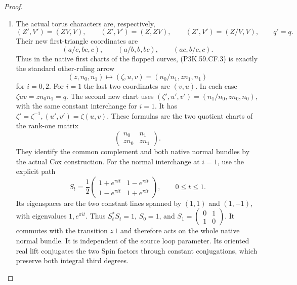 \begin{proof}
\begin{enumerate}[label=\arabic*.]
\item The actual torus characters are, respectively,
\[
 (Z',V')=(ZV,V),\qquad (Z',V')=(Z,ZV),\qquad
 (Z',V')=(Z/V,V),\qquad q'=q.                         \tag{P3K.59.CF.3}
\]
Their new first-triangle coordinates are
\[
 (a/c,bc,c),\qquad (a/b,b,bc),\qquad (ac,b/c,c).        \tag{P3K.59.CF.4}
\]
Thus in the native first charts of the flopped curves, (P3K.59.CF.3)
is exactly the standard other-ruling arrow
\[
 (z,n_0,n_1)\longmapsto
  (\zeta,u,v)=(n_0/n_1,zn_1,n_1)                     \tag{P3K.59.CF.5}
\]
for \(i=0,2\). For \(i=1\) the last two coordinates are
\((v,u)\). In each case \(\zeta uv=zn_0n_1=q\).
The second new chart uses
\((\zeta',u',v')=(n_1/n_0,zn_0,n_0)\), with the same
constant interchange for \(i=1\). It has
\(\zeta'=\zeta^{-1},(u',v')=\zeta(u,v)\).
These formulas are the two quotient charts of the rank-one matrix
\[
 \begin{pmatrix}n_0&n_1\\zn_0&zn_1\end{pmatrix}.       \tag{P3K.59.CF.6}
\]
They identify the common complement and both native normal bundles
by the actual Cox construction. For the normal interchange at
\(i=1\), use the explicit path
\[
 S_t=\frac12
 \begin{pmatrix}
 1+e^{\pi it}&1-e^{\pi it}\\
 1-e^{\pi it}&1+e^{\pi it}
 \end{pmatrix},\qquad 0\le t\le1.                    \tag{P3K.59.CF.6a}
\]
Its eigenspaces are the two constant lines spanned by
\((1,1)\) and \((1,-1)\), with eigenvalues \(1,e^{\pi it}\).
Thus \(S_t^*S_t=1\), \(S_0=1\), and
\(S_1=(\begin{smallmatrix}0&1\\1&0\end{smallmatrix})\).
It commutes with the transition \(z\,1\) and therefore acts on
the whole native normal bundle. It is independent of the source
loop parameter. Its oriented real lift conjugates the two
Spin factors through constant conjugations, which preserve
both integral third degrees.


\end{enumerate}
\end{proof}
